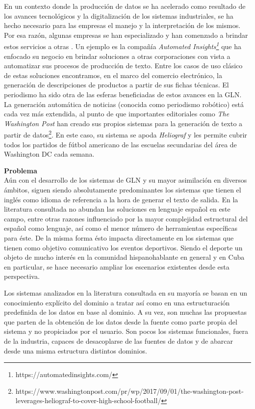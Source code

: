     En un contexto donde la producción de datos se ha acelerado como resultado de los avances tecnológicos y la digitalización de los sistemas industriales, se ha hecho necesario para 
las empresas el manejo y la interpretación de los mismos. Por esa raz\'on, algunas empresas se han especializado y han comenzado a brindar estos servicios a otras . 
Un ejemplo es la compañía \textit{Automated Insights\footnote[1]{https://automatedinsights.com/}} que ha enfocado su negocio en brindar soluciones a otras corporaciones con vista a automatizar sus 
procesos de producción de texto. Entre los casos de uso clásico de estas soluciones encontramos, en el marco del comercio electr\'onico, la generación de descripciones de 
productos a partir de sus fichas técnicas. El periodismo ha sido otra de las esferas beneficiadas de estos avances en la GLN. La generación automática de noticias (conocida como 
periodismo robótico) está cada vez más extendida, al punto de que importantes editoriales como \textit{The Washington Post} han creado sus propios sistemas para la generación de 
texto a partir de datos\footnote[2]{https://www.washingtonpost.com/pr/wp/2017/09/01/the-washington-post-leverages-heliograf-to-cover-high-school-football/}. 
En este caso, su sistema se apoda \textit{Heliograf} y les permite cubrir todos los partidos de fútbol americano de las escuelas secundarias del área de Washington DC 
cada semana.

       \textbf{Problema}\\

    Aún con el desarrollo de los sistemas de GLN y su mayor asimilación en diversos ámbitos, siguen siendo absolutamente predominantes los 
sistemas que tienen el inglés como idioma de referencia a la hora de generar el texto de salida. En la literatura consultada no abundan las soluciones 
en lenguaje español en este campo, entre otras razones influenciado por la mayor complejidad estructural del español como lenguaje, así como el menor número 
de herramientas específicas para éste. De la misma forma ésto impacta directamente en los sistemas que tienen como objetivo comunicativo los eventos deportivos. Siendo el deporte un objeto de mucho interés en la 
comunidad hispanohablante en general y en Cuba en particular, se hace necesario ampliar los escenarios existentes desde esta perspectiva.

    Los sistemas analizados en la literatura consultada en su mayoría se basan en un conocimiento explícito del dominio a tratar así como en una 
estructuración predefinida de los datos en base al dominio. A su vez, son muchas las propuestas que parten de la obtención de los datos desde 
la fuente como parte propia del sistema y no propiciados por el usuario. Son pocos los sistemas funcionales, fuera de la industria, capaces de 
desacoplarse de las fuentes de datos y de abarcar desde una misma estructura distintos dominios.\\

